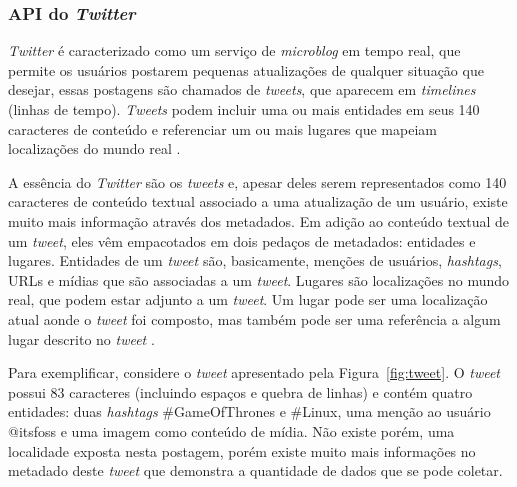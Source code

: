 \subsubsection{API do \textit{Twitter}}\label{api-twitter}
\textit{Twitter} é caracterizado como um serviço de \textit{microblog} em tempo real, que permite os usuários postarem pequenas atualizações de qualquer situação que desejar, essas postagens são chamados de \textit{tweets}, que aparecem em \textit{timelines} (linhas de tempo). \textit{Tweets} podem incluir uma ou mais entidades em seus 140 caracteres de conteúdo e referenciar um ou mais lugares que mapeiam localizações do mundo real \cite{mining-social-web}.


A essência do \textit{Twitter} são os \textit{tweets} e, apesar deles serem representados como 140 caracteres de conteúdo textual associado a uma atualização de um usuário, existe muito mais informação através dos metadados. Em adição ao conteúdo textual de um \textit{tweet}, eles vêm empacotados em dois pedaços de metadados: entidades e lugares. Entidades de um \textit{tweet} são, basicamente, menções de usuários, \textit{hashtags}, URLs e mídias que são associadas a um \textit{tweet}. Lugares são localizações no mundo real, que podem estar adjunto a um \textit{tweet}. Um lugar pode ser uma localização atual aonde o \textit{tweet} foi composto, mas também pode ser uma referência a algum lugar descrito no \textit{tweet} \cite{twitter-doc}.

Para exemplificar, considere o \textit{tweet} apresentado pela Figura~\ref{fig:tweet}. O \textit{tweet} possui 83 caracteres (incluindo espaços e quebra de linhas) e contém quatro entidades: duas \textit{hashtags} \#GameOfThrones e \#Linux, uma menção ao usuário @itsfoss e uma imagem como conteúdo de mídia. Não existe porém, uma localidade exposta nesta postagem, porém existe muito mais informações no metadado deste \textit{tweet} que demonstra a quantidade de dados que se pode coletar.

